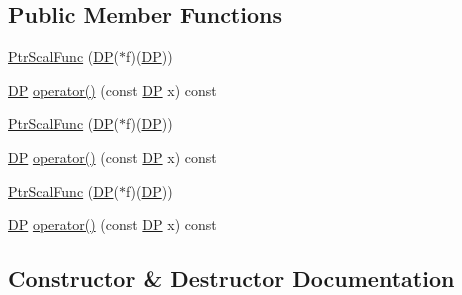 \subsection*{Public Member Functions}
\begin{DoxyCompactItemize}
\item 
\mbox{\hyperlink{classNR_1_1PtrScalFunc_aa3e7954dd902a46c492bd39d4c21a71c}{Ptr\+Scal\+Func}} (\mbox{\hyperlink{namespaceNR_af6ff762dd605ff477b8e52387253a02a}{DP}}($\ast$f)(\mbox{\hyperlink{namespaceNR_af6ff762dd605ff477b8e52387253a02a}{DP}}))
\item 
\mbox{\hyperlink{namespaceNR_af6ff762dd605ff477b8e52387253a02a}{DP}} \mbox{\hyperlink{classNR_1_1PtrScalFunc_a661b2194b67e1e0e0de15389f0cea5f1}{operator()}} (const \mbox{\hyperlink{namespaceNR_af6ff762dd605ff477b8e52387253a02a}{DP}} x) const
\item 
\mbox{\hyperlink{classNR_1_1PtrScalFunc_aa3e7954dd902a46c492bd39d4c21a71c}{Ptr\+Scal\+Func}} (\mbox{\hyperlink{namespaceNR_af6ff762dd605ff477b8e52387253a02a}{DP}}($\ast$f)(\mbox{\hyperlink{namespaceNR_af6ff762dd605ff477b8e52387253a02a}{DP}}))
\item 
\mbox{\hyperlink{namespaceNR_af6ff762dd605ff477b8e52387253a02a}{DP}} \mbox{\hyperlink{classNR_1_1PtrScalFunc_a661b2194b67e1e0e0de15389f0cea5f1}{operator()}} (const \mbox{\hyperlink{namespaceNR_af6ff762dd605ff477b8e52387253a02a}{DP}} x) const
\item 
\mbox{\hyperlink{classNR_1_1PtrScalFunc_aa3e7954dd902a46c492bd39d4c21a71c}{Ptr\+Scal\+Func}} (\mbox{\hyperlink{namespaceNR_af6ff762dd605ff477b8e52387253a02a}{DP}}($\ast$f)(\mbox{\hyperlink{namespaceNR_af6ff762dd605ff477b8e52387253a02a}{DP}}))
\item 
\mbox{\hyperlink{namespaceNR_af6ff762dd605ff477b8e52387253a02a}{DP}} \mbox{\hyperlink{classNR_1_1PtrScalFunc_a661b2194b67e1e0e0de15389f0cea5f1}{operator()}} (const \mbox{\hyperlink{namespaceNR_af6ff762dd605ff477b8e52387253a02a}{DP}} x) const
\end{DoxyCompactItemize}


\subsection{Constructor \& Destructor Documentation}
\mbox{\label{classNR_1_1PtrScalFunc_aa3e7954dd902a46c492bd39d4c21a71c}} 
